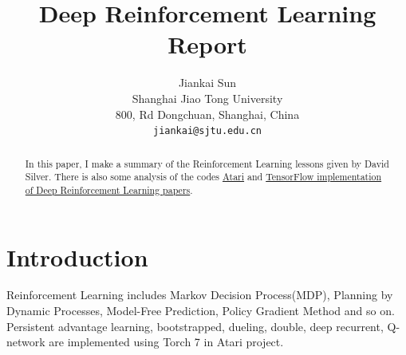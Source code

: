 \documentclass[10pt,twocolumn,letterpaper]{article}
\begin{document}
\title{Deep Reinforcement Learning Report}

\author{Jiankai Sun\\
Shanghai Jiao Tong University\\
800, Rd Dongchuan, Shanghai, China\\
{\tt\small jiankai@sjtu.edu.cn}
}

\maketitle

\begin{abstract}
	In this paper, I make a summary of the Reinforcement Learning lessons given by David Silver. There is also some analysis of the codes \href{https://github.com/Kaixhin/Atari}{Atari} and \href{https://github.com/carpedm20/deep-rl-tensorflow}{TensorFlow implementation of Deep Reinforcement Learning papers}. 
\end{abstract}

\section{Introduction}

Reinforcement Learning includes Markov Decision Process(MDP), Planning by Dynamic Processes, Model-Free Prediction, Policy Gradient Method and so on. Persistent advantage learning, bootstrapped, dueling, double, deep recurrent, Q-network are implemented using Torch 7 in Atari project.
\end{document}
